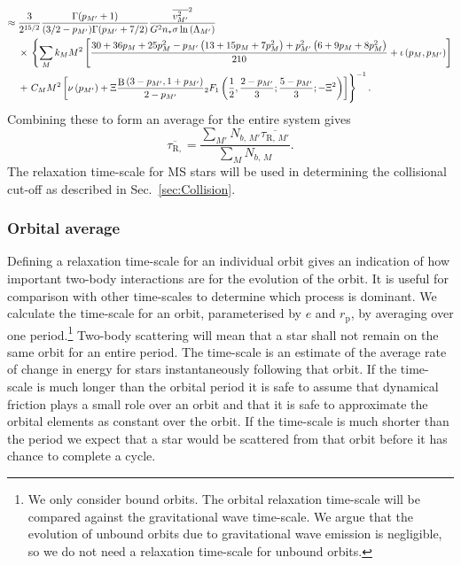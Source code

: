 \documentclass[useAMS,usedcolumn,usegraphicx,usenatbib]{mn2e}
\newcommand{\secref}[1]{Sec.~\ref{sec:#1}}
\DeclareMathOperator{\Beta}{B}
\newcommand{\sub}[1]{\ensuremath{_\mathrm{#1}}}
\newcommand{\recip}[1]{\ensuremath{\dfrac{1}{#1}}}
\begin{document}
\begin{onecolumn}
\begin{align}
 \approx {} & \frac{3}{2^{15/2}}\frac{\Gamma(p_{M'} + 1)}{(3/2 - p_{M'})\Gamma(p_{M'} + 7/2)}\frac{\overline{v_{M'}^2}^2}{G^2n_\ast\sigma\ln\left(\Lambda_{M'}\right)} \nonumber \\* 
  & \times {} \left\{\sum_M k_M M^2 \left[ \frac{30 + 36p_M + 25p_M^2 - p_{M'}\left(13 + 15p_M + 7 p_M^2\right) + p_{M'}^2\left(6 + 9p_M + 8p_M^2\right)}{210} + \iota \left(p_M,p_{M'}\right)\right] \right. \nonumber \\*
  & + \left. \vphantom{ \left[ \frac{p_{M'}^2\left(6 + 9p_M + 8p_M^2\right)}{210}\right]} C_M M^2 \left[\nu\left(p_{M'}\right) + \Xi\frac{\Beta\left(3-p_{M'},1+p_{M'}\right)}{2-p_{M'}}{_2F_1}\left(\recip{2},\frac{2-p_{M'}}{3};\frac{5-p_{M'}}{3};-\Xi^2\right)\right]\right\}^{-1}.
\end{align}
Combining these to form an average for the entire system gives
\begin{equation}
\overline{\tau_{\mathrm{R,}}} = \frac{\sum_{M'}N_{b,\,M'}\overline{\tau_{\mathrm{R,}\,M'}}}{\sum_{M}N_{b,\,M}}.
\label{eq:system-relax}
\end{equation}
The relaxation time-scale for MS stars will be used in determining the collisional cut-off as described in \secref{Collision}.

\subsubsection{Orbital average}\label{sec:orbital-ave}

Defining a relaxation time-scale for an individual orbit gives an indication of how important two-body interactions are for the evolution of the orbit. It is useful for comparison with other time-scales to determine which process is dominant. We calculate the time-scale for an orbit, parameterised by $e$ and $r\sub{p}$, by averaging over one period.\footnote{We only consider bound orbits. The orbital relaxation time-scale will be compared against the gravitational wave time-scale. We argue that the evolution of unbound orbits due to gravitational wave emission is negligible, so we do not need a relaxation time-scale for unbound orbits.}  Two-body scattering will mean that a star shall not remain on the same orbit for an entire period. The time-scale is an estimate of the average rate of change in energy for stars instantaneously following that orbit. If the time-scale is much longer than the orbital period it is safe to assume that dynamical friction plays a small role over an orbit and that it is safe to approximate the orbital elements as constant over the orbit. If the time-scale is much shorter than the period we expect that a star would be scattered from that orbit before it has chance to complete a cycle.


\end{onecolumn}
\end{document}
